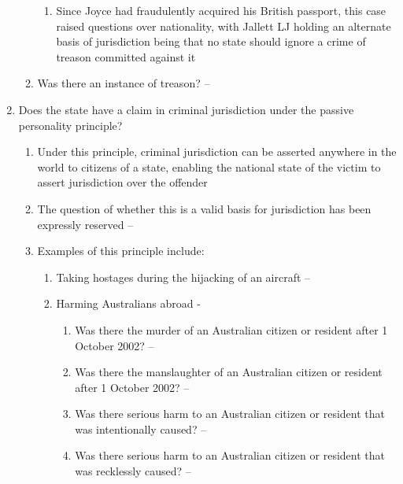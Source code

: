 \begin{enumerate}
\begin{enumerate}
\begin{enumerate}
            \item Since Joyce had fraudulently acquired his British passport, this case raised questions over nationality, with Jallett LJ holding an alternate basis of jurisdiction being that no state should ignore a crime of treason committed against it
        \end{enumerate}
        \item Was there an instance of treason? -- 
    \end{enumerate}
    \item Does the state have a claim in criminal jurisdiction under the passive personality principle?
    \begin{enumerate}
        \item Under this principle, criminal jurisdiction can be asserted anywhere in the world to citizens of a state, enabling the national state of the victim to assert jurisdiction over the offender
        \item The question of whether this is a valid basis for jurisdiction has been expressly reserved -- 
        \item Examples of this principle include:
        \begin{enumerate}
            \item Taking hostages during the hijacking of an aircraft -- 
            \item Harming Australians abroad - 
            \begin{enumerate}
                \item Was there the murder of an Australian citizen or resident after 1 October 2002? -- 
                \item Was there the manslaughter of an Australian citizen or resident after 1 October 2002? -- 
                \item Was there serious harm to an Australian citizen or resident that was intentionally caused? -- 
                \item Was there serious harm to an Australian citizen or resident that was recklessly caused? -- 
            \end{enumerate}
        \end{enumerate}
    \end{enumerate}

\end{enumerate}

